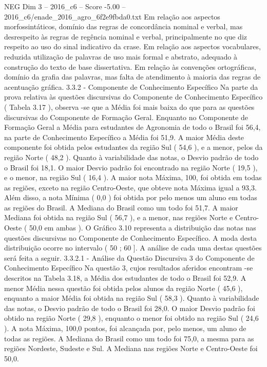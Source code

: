 \begin{textsample}{NEG Dim 3 – 2016\_c6 – Score -5.00 – 2016\_c6/enade\_2016\_agro\_6f2e9fbda0.txt}
Em relação aos aspectos morfossintáticos, domínio das regras de concordância nominal e verbal, mas desrespeito às regras de regência nominal e verbal, principalmente no que diz respeito ao uso do sinal indicativo da crase.
Em relação aos aspectos vocabulares, reduzida utilização de palavras de uso mais formal e abstrato, adequado à construção do texto de base dissertativa.
Em relação às convenções ortográficas, domínio da grafia das palavras, mas falta de atendimento à maioria das regras de acentuação gráfica. 3.3.2 - Componente de Conhecimento Específico Na parte da prova relativa às questões discursivas do Componente de Conhecimento Específico ( Tabela 3.17 ), observa -se que a Média foi mais baixa do que para as questões discursivas do Componente de Formação Geral.
Enquanto no Componente de Formação Geral a Média para estudantes de Agronomia de todo o Brasil foi 56,4, na parte de Conhecimento Específico a Média foi 51,9.
A maior Média deste componente foi obtida pelos estudantes da região Sul ( 54,6 ), e a menor, pelos da região Norte ( 48,2 ).
Quanto à variabilidade das notas, o Desvio padrão de todo o Brasil foi 18,1.
O maior Desvio padrão foi encontrado na região Norte ( 19,5 ), e o menor, na região Sul ( 16,4 ).
A maior nota Máxima, 100, foi obtida em todas as regiões, exceto na região Centro-Oeste, que obteve nota Máxima igual a 93,3.
Além disso, a nota Mínima ( 0,0 ) foi obtida por pelo menos um aluno em todas as regiões do Brasil.
A Mediana do Brasil como um todo foi 51,7.
A maior Mediana foi obtida na região Sul ( 56,7 ), e a menor, nas regiões Norte e Centro-Oeste ( 50,0 em ambas ).
O Gráfico 3.10 representa a distribuição das notas nas questões discursivas no Componente de Conhecimento Específico.
A moda desta distribuição ocorre no intervalo ( 50 ; 60 ].
A análise de cada uma destas questões será feita a seguir. 3.3.2.1 - Análise da Questão Discursiva 3 do Componente de Conhecimento Específico Na questão 3, cujos resultados aferidos encontram -se descritos na Tabela 3.18, a Média dos estudantes de todo o Brasil foi 52,9.
A menor Média nessa questão foi obtida pelos alunos da região Norte ( 45,6 ), enquanto a maior Média foi obtida na região Sul ( 58,3 ).
Quanto à variabilidade das notas, o Desvio padrão de todo o Brasil foi 28,0.
O maior Desvio padrão foi obtido na região Norte ( 29,8 ), enquanto o menor foi obtido na região Sul ( 24,6 ).
A nota Máxima, 100,0 pontos, foi alcançada por, pelo menos, um aluno de todas as regiões.
A Mediana do Brasil como um todo foi 75,0, a mesma para as regiões Nordeste, Sudeste e Sul.
A Mediana nas regiões Norte e Centro-Oeste foi 50,0.

\end{textsample}
